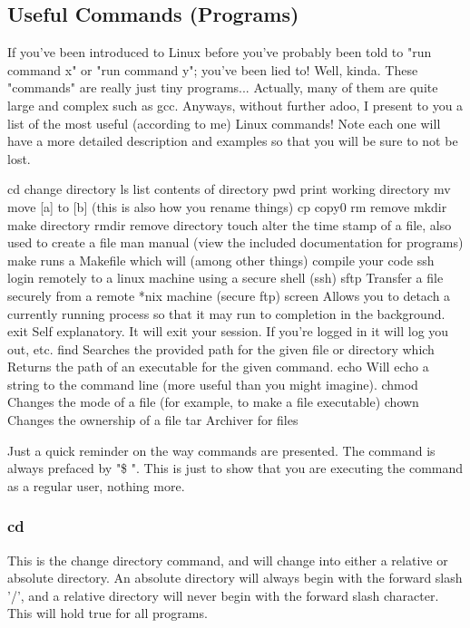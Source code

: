 \subsection{Useful Commands (Programs)} \mdseries
If you've been introduced to Linux before you've probably been told to "run command x" or "run command y"; you've been lied to!  Well, kinda.  These "commands" are really just tiny programs... Actually, many of them are quite large and complex such as gcc.  Anyways, without further adoo, I present to you a list of the most useful (according to me) Linux commands!  Note each one will have a more detailed description and examples so that you will be sure to not be lost.

	cd		change directory
	ls		list contents of directory
	pwd		print working directory
	mv		move [a] to [b] (this is also how you rename things)
	cp		copy0
	rm		remove
	mkdir	make directory
	rmdir	remove directory
	touch	alter the time stamp of a file, also used to create a file
	man		manual (view the included documentation for programs)
	make	runs a Makefile which will (among other things) compile your code
	ssh		login remotely to a linux machine using a secure shell (ssh)
	sftp	Transfer a file securely from a remote *nix machine (secure ftp)
	screen	Allows you to detach a currently running process so that it may run to completion in the background.
	exit	Self explanatory.  It will exit your session.  If you're logged in it will log you out, etc.
	find	Searches the provided path for the given file or directory
	which	Returns the path of an executable for the given command.  
	echo	Will echo a string to the command line (more useful than you might imagine).
	chmod	Changes the mode of a file (for example, to make a file executable)
	chown	Changes the ownership of a file
	tar		Archiver for files
		
Just a quick reminder on the way commands are presented.  The command is always prefaced by "\$ ".  This is just to show that you are executing the command as a regular user, nothing more.

\subsubsection{cd} \mdseries
This is the change directory command, and will change into either a relative or absolute directory.  An absolute directory will always begin with the forward slash '/', and a relative directory will never begin with the forward slash character.  This will hold true for all programs.

